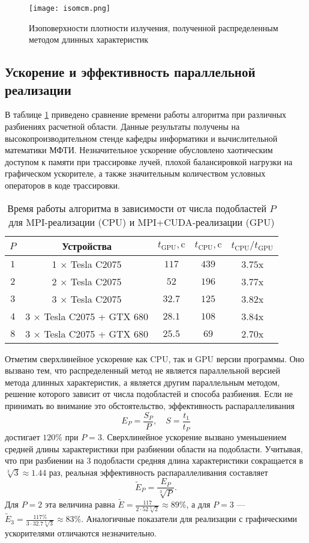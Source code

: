 \begin{figure}[ht!]
\centering
\texttt{[image: isomcm.png]}
\caption{Изоповерхности плотности излучения, полученной распределенным методом длинных характеристик}
\label{fig:isomcm}
\end{figure}

\subsection{Ускорение и эффективность параллельной реализации}

В таблице \ref{tab:speedup} приведено сравнение времени работы алгоритма при различных разбиениях расчетной области. Данные результаты получены на высокопроизводительном стенде кафедры информатики и вычислительной математики МФТИ. Незначительное ускорение обусловлено хаотическим доступом к памяти при трассировке лучей, плохой балансировкой нагрузки на графическом ускорителе, а также значительным количеством условных операторов в коде трассировки. 
\begin{table}[ht!]
\RawFloats
\centering
\caption{Время работы алгоритма в зависимости от числа подобластей $P$ для MPI-реализации (CPU) и MPI+CUDA-реализации (GPU)}
\begin{tabular}{|c|c|c|c|c|}
\hline
$P$ & Устройства & $t_\text{GPU}, \text{c}$ & $t_\text{CPU}, \text{c}$ & $t_\text{CPU} / t_\text{GPU}$\\\hline
$1$& 1 $\times$ Tesla C2075 & $117$ & $439$ & $3.75$x\\\hline
$2$& 2 $\times$ Tesla C2075 & $52$ & $196$ & $3.77$x\\\hline
$3$& 3 $\times$ Tesla C2075 & $32.7$ & $125$ & $3.82$x\\\hline
$4$& 3 $\times$ Tesla C2075 + GTX 680 & $28.1$ & $108$ & $3.84$x\\
\hline
$8$& 3 $\times$ Tesla C2075 + GTX 680 & $25.5$ & $69$ & $2.70$x\\\hline
\end{tabular}
\label{tab:speedup}
\end{table}

Отметим сверхлинейное ускорение как CPU, так и GPU версии программы. Оно вызвано тем, что распределенный метод не является параллельной версией метода длинных характеристик, а является другим параллельным методом, решение которого зависит от числа подобластей и способа разбиения. Если не принимать во внимание это обстоятельство, эффективность распараллеливания
\[
E_P = \frac{S_P}{P}, \quad S = \frac{t_1}{t_P}
\]
достигает $120 \%$ при $P = 3$. Сверхлинейное ускорение вызвано уменьшением средней длины характеристики при разбиении области на подобласти. Учитывая, что при разбиении на $3$ подобласти средняя длина характеристики сокращается в $\sqrt[3]{3} \approx 1.44$ раз, реальная эффективность распараллеливания составляет 
\[
\tilde E_P = \frac{E_P}{\sqrt[3]{P}}.
\]
Для $P=2$ эта величина равна $\tilde E = \frac{117}{2 \cdot 52 \sqrt[3]{2}} \approx 89 \%$, а для $P = 3$ --- $\tilde E_3 = \frac{117 \%}{3 \cdot 32.7\sqrt[3]{3}} \approx 83 \%$. Аналогичные показатели для реализации с графическими ускорителями отличаются незначительно.

